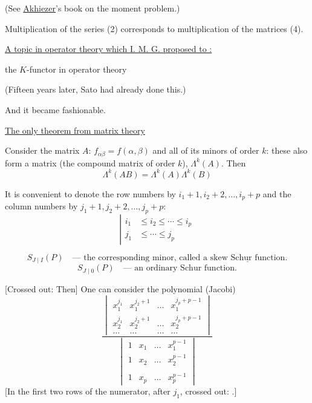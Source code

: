 (See \underline{Akhiezer}'s book on the moment problem.)

Multiplication of the series (2) corresponds to multiplication of the matrices (4).


\underline{A topic in operator theory which I. M. G. proposed to
:}

the $K$-functor in operator theory

(Fifteen years later, Sato had already done this.)

And it became fashionable.

\underline{The only theorem from matrix theory}

Consider the matrix $A$: $f_{\alpha\beta}=f(\alpha,\beta)$ and all of its minors
of order $k$: these also form a matrix (the compound matrix of order $k$),
$\Lambda^k(A)$. Then
\begin{equation*}
\Lambda^k(AB)=\Lambda^k(A)\Lambda^k(B) \tag{5}
\end{equation*}

It is convenient to denote the row numbers by $i_1+1,i_2+2,\ldots,i_p+p$ and the column numbers by
$j_1+1,j_2+2,\ldots,j_p+p$:
\begin{equation*}
\left|\begin{aligned}
i_1&\le i_2\le\cdots\le i_p\\
j_1&\le\cdots\le j_p
\end{aligned}\right.
\end{equation*}

\begin{equation*}
S_{J\mid I}(P)\quad\text{--- the corresponding minor, called a }\underline{\text{skew Schur function}}. \tag{6}
\end{equation*}
\begin{equation*}
S_{J\mid 0}(P)\quad\text{--- an ordinary Schur function.}
\end{equation*}

[Crossed out: Then] One can consider the polynomial (Jacobi)
\begin{equation*}
\frac{
\begin{vmatrix}
x_1^{j_1}&x_1^{j_2+1}&\ldots&x_1^{j_p+p-1}\\
x_2^{j_1}&x_2^{j_2+1}&\ldots&x_2^{j_p+p-1}\\
\ldots&\ldots&\ldots&\ldots
\end{vmatrix}
}{
\begin{vmatrix}
1&x_1&\ldots&x_1^{p-1}\\
1&x_2&\ldots&x_2^{p-1}\\
&&&\\
1&x_p&\ldots&x_p^{p-1}
\end{vmatrix}
} \tag{7}
\end{equation*}
[In the first two rows of the numerator, after $j_1$, crossed out:
.]

